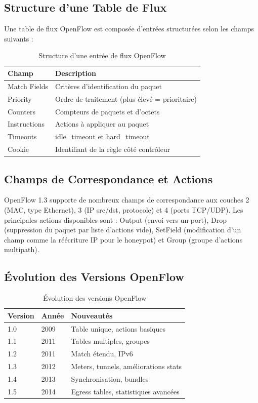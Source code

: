 \documentclass[12pt,a4paper]{report}
\begin{document}
\subsection{Structure d'une Table de Flux}
Une table de flux OpenFlow est composée d'entrées
structurées selon les champs suivants :

\begin{table}[H]
\centering
\caption{Structure d'une entrée de flux OpenFlow}
\label{tab:flow_entry}
\begin{tabular}{ll}
\toprule
\textbf{Champ} & \textbf{Description} \\
\midrule
Match Fields & Critères d'identification du paquet \\
Priority & Ordre de traitement (plus élevé = prioritaire) \\
Counters & Compteurs de paquets et d'octets \\
Instructions & Actions à appliquer au paquet \\
Timeouts & idle\_timeout et hard\_timeout \\
Cookie & Identifiant de la règle côté contrôleur \\
\bottomrule
\end{tabular}
\end{table}

\subsection{Champs de Correspondance et Actions}
OpenFlow 1.3 supporte de nombreux champs de correspondance
aux couches 2 (MAC, type Ethernet), 3 (IP src/dst,
protocole) et 4 (ports TCP/UDP). Les principales actions
disponibles sont : Output (envoi vers un port),
Drop (suppression du paquet par liste d'actions vide),
SetField (modification d'un champ comme la réécriture IP
pour le honeypot) et Group (groupe d'actions multipath).

\subsection{Évolution des Versions OpenFlow}

\begin{table}[H]
\centering
\caption{Évolution des versions OpenFlow}
\label{tab:of_versions}
\begin{tabular}{lll}
\toprule
\textbf{Version} & \textbf{Année} & \textbf{Nouveautés} \\
\midrule
1.0 & 2009 & Table unique, actions basiques \\
1.1 & 2011 & Tables multiples, groupes \\
1.2 & 2011 & Match étendu, IPv6 \\
1.3 & 2012 & Meters, tunnels, améliorations stats \\
1.4 & 2013 & Synchronisation, bundles \\
1.5 & 2014 & Egress tables, statistiques avancées \\
\bottomrule
\end{tabular}
\end{table}
\end{document}
